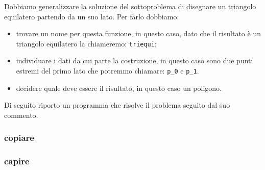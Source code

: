 Dobbiamo generalizzare la soluzione del sottoproblema di disegnare un triangolo 
equilatero partendo da un suo lato. Per farlo dobbiamo:
\begin{itemize} [nosep]
 \item trovare un nome per questa funzione, in questo caso,  dato che il 
risultato è un triangolo equilatero la chiameremo: \lstinline{triequi};
 \item individuare i dati da cui parte la costruzione, in questo caso sono due 
punti estremi del primo lato che potremmo chiamare:
\lstinline{p_0} e \lstinline{p_1}.
 \item decidere quale deve essere il risultato, in questo caso un poligono.
\end{itemize}

Di seguito riporto un programma che risolve il problema seguito dal suo 
commento.

\subsubsection{copiare}



\subsubsection{capire}

